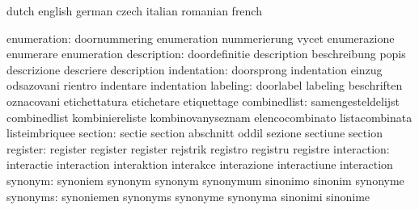 
\startsetupvariables       dutch                     english
                           german                    czech
                           italian                   romanian
                           french

              enumeration: doornummering             enumeration
                           nummerierung              vycet
                           enumerazione              enumerare
                           enumeration
              description: doordefinitie             description
                           beschreibung              popis
                           descrizione               descriere
                           description
              indentation: doorsprong                indentation
                           einzug                    odsazovani
                           rientro                   indentare
                           indentation
                 labeling: doorlabel                 labeling
                           beschriften               oznacovani
                           etichettatura             etichetare
                           etiquettage
             combinedlist: samengesteldelijst        combinedlist
                           kombiniereliste           kombinovanyseznam
                           elencocombinato           listacombinata
                           listeimbriquee
                  section: sectie                    section
                           abschnitt                 oddil
                           sezione                   sectiune
                           section
                 register: register                  register
                           register                  rejstrik
                           registro                  registru
                           registre
              interaction: interactie                interaction
                           interaktion               interakce
                           interazione               interactiune
                           interaction
                  synonym: synoniem                  synonym
                           synonym                   synonymum
                           sinonimo                  sinonim
                           synonyme
                 synonyms: synoniemen                synonyms
                           synonyme                  synonyma
                           sinonimi                  sinonime
